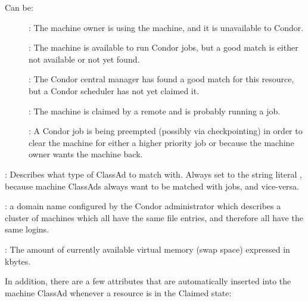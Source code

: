 \begin{description}
Can be:
	\begin{description}
	\item[] : The machine owner is using the machine, and
it is unavailable to Condor.
	\item[] : The machine is available to run Condor jobs,
but a good match is either not available or not 
yet found.
	\item[] : The Condor central manager has found a good
match for this resource, but a Condor scheduler has not yet claimed it.
	\item[] : The machine is claimed by a remote
 and is probably running a job.
	\item[] : A Condor job is being preempted (possibly
via checkpointing) in order to clear the machine for either a higher
priority job or because the machine owner wants the machine back.
	\end{description}   %
%
\item[\AdAttr{TargetType}] : Describes what type of ClassAd to match with.
Always set to the string literal , because machine ClassAds
always want to be matched with jobs, and vice-versa.
%
\item[\AdAttr{UidDomain}] : a domain name configured by the Condor 
administrator which describes a cluster of machines which all have 
the same  file entries, and therefore all have the same logins.
%
\item[\AdAttr{VirtualMemory}] : The amount of currently available virtual memory 
(swap space) expressed in kbytes.

\end{description}

In addition, there are a few attributes that are automatically
inserted into the machine ClassAd whenever a resource is in the
Claimed state:

